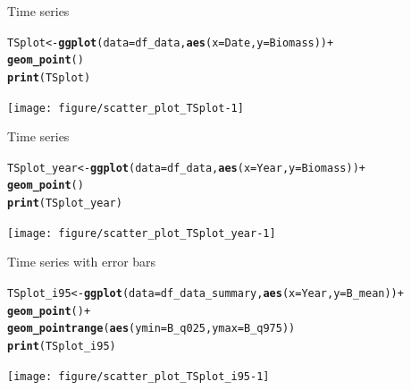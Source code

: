\documentclass{beamer}\usepackage[]{graphicx}\usepackage[]{color}
\makeatletter
\newcommand{\hlopt}[1]{\textcolor[rgb]{0,0,0}{#1}}%
\newcommand{\hlstd}[1]{\textcolor[rgb]{0.345,0.345,0.345}{#1}}%
\newcommand{\hlkwb}[1]{\textcolor[rgb]{0.69,0.353,0.396}{#1}}%
\newcommand{\hlkwc}[1]{\textcolor[rgb]{0.333,0.667,0.333}{#1}}%
\newcommand{\hlkwd}[1]{\textcolor[rgb]{0.737,0.353,0.396}{\textbf{#1}}}%
\newenvironment{kframe}{%
 \def\at@end@of@kframe{}%
 \ifinner\ifhmode%
  \def\at@end@of@kframe{\end{minipage}}%
  \begin{minipage}{\columnwidth}%
 \fi\fi%
 \def\FrameCommand##1{\hskip\@totalleftmargin \hskip-\fboxsep
 \colorbox{shadecolor}{##1}\hskip-\fboxsep
     \hskip-\linewidth \hskip-\@totalleftmargin \hskip\columnwidth}%
 \MakeFramed {\advance\hsize-\width
   \@totalleftmargin\z@ \linewidth\hsize
   \@setminipage}}%
 {\par\unskip\endMakeFramed%
 \at@end@of@kframe}
\newenvironment{knitrout}{}{} %
\makeatother
\begin{document}
\begin{frame}[fragile]{Time series}
\begin{knitrout}\footnotesize
{}\color{fgcolor}\begin{kframe}
\begin{alltt}
\hlstd{TSplot} \hlkwb{<-} \hlkwd{ggplot}\hlstd{(}\hlkwc{data}\hlstd{=df_data,} \hlkwd{aes}\hlstd{(}\hlkwc{x}\hlstd{=Date,} \hlkwc{y}\hlstd{=Biomass))} \hlopt{+}
  \hlkwd{geom_point}\hlstd{()}
\hlkwd{print}\hlstd{(TSplot)}
\end{alltt}
\end{kframe}

{\centering \texttt{[image: figure/scatter\_plot\_TSplot-1]} 

}



\end{knitrout}
\end{frame}


\begin{frame}[fragile]{Time series}
\begin{knitrout}\footnotesize
{}\color{fgcolor}\begin{kframe}
\begin{alltt}
\hlstd{TSplot_year} \hlkwb{<-} \hlkwd{ggplot}\hlstd{(}\hlkwc{data}\hlstd{=df_data,} \hlkwd{aes}\hlstd{(}\hlkwc{x}\hlstd{=Year,} \hlkwc{y}\hlstd{=Biomass))} \hlopt{+}
  \hlkwd{geom_point}\hlstd{()}
\hlkwd{print}\hlstd{(TSplot_year)}
\end{alltt}
\end{kframe}

{\centering \texttt{[image: figure/scatter\_plot\_TSplot\_year-1]} 

}



\end{knitrout}
\end{frame}


\begin{frame}[fragile]{Time series with error bars}
\begin{knitrout}\footnotesize
{}\color{fgcolor}\begin{kframe}
\begin{alltt}
\hlstd{TSplot_i95} \hlkwb{<-} \hlkwd{ggplot}\hlstd{(}\hlkwc{data}\hlstd{=df_data_summary,} \hlkwd{aes}\hlstd{(}\hlkwc{x}\hlstd{=Year,} \hlkwc{y}\hlstd{=B_mean))} \hlopt{+}
  \hlkwd{geom_point}\hlstd{()} \hlopt{+}
  \hlkwd{geom_pointrange}\hlstd{(}\hlkwd{aes}\hlstd{(}\hlkwc{ymin} \hlstd{= B_q025,} \hlkwc{ymax} \hlstd{= B_q975))}
\hlkwd{print}\hlstd{(TSplot_i95)}
\end{alltt}
\end{kframe}

{\centering \texttt{[image: figure/scatter\_plot\_TSplot\_i95-1]} 

}



\end{knitrout}
\end{frame}
\end{document}
